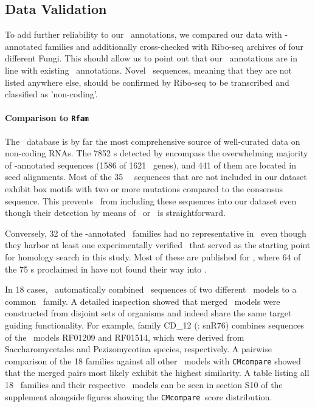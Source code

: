 \subsection{Data Validation}

To add further reliability to our \sno\ annotations, we compared our data
with \rfam -annotated families and additionally cross-checked with Ribo-seq
archives of four different Fungi. This should allow us to point out that
our \snostrip\ annotations are in line with existing \rfam\
annotations. Novel \sno\ sequences, meaning that they are not listed
anywhere else, should be confirmed by Ribo-seq to be transcribed and
classified as 'non-coding'.
 
\paragraph{\textbf{Comparison to \texttt{Rfam}}}
The \rfam\ database \cite{Nawrocki:2015} is by far the most
comprehensive source of well-curated data on non-coding RNAs. The 7852
\sno s detected by \snostrip encompass the overwhelming majority
of \rfam -annotated sequences (1586 of 1621 \sno\ genes), and 441 of
them are located in seed alignments.  Most of the 35 \rfam\ \sno\
sequences that are not included in our dataset exhibit box motifs with
two or more mutations compared to the consensus sequence. This
prevents \snostrip\ from including these sequences into our dataset
even though their detection by means of \blast\ or \infernal\ is
straightforward.

Conversely, 32 of the \snostrip -annotated \sno\ families had no
representative in \rfam\ even though they harbor at least one
experimentally verified \sno\ that served as the starting point for
homology search in this study. Most of these are published for \ncr, where
64 of the 75 \sno s proclaimed in \cite{Liu:2009} have not found their way
into \rfam.

In 18 cases, \snostrip\ automatically combined \sno\ sequences of two
different \rfam\ models to a common \sno\ family. A detailed inspection
showed that merged \rfam\ models were constructed from disjoint sets of
organisms and indeed share the same target guiding functionality. For
example, family CD\_12 (\sce: snR76) combines sequences of the \rfam\
models RF01209 and RF01514, which were derived from Saccharomycetales and
Pezizomycotina species, respectively. A pairwise comparison of the 18
families against all other \rfam\ models with \texttt{CMcompare}
\cite{Eggenhofer:2013} showed that the merged pairs most likely exhibit the
highest similarity. A table listing all 18 \sno\ families and their
respective \rfam\ models can be seen in section S10 of the supplement
alongside figures showing the \texttt{CMcompare}\ score distribution.  

